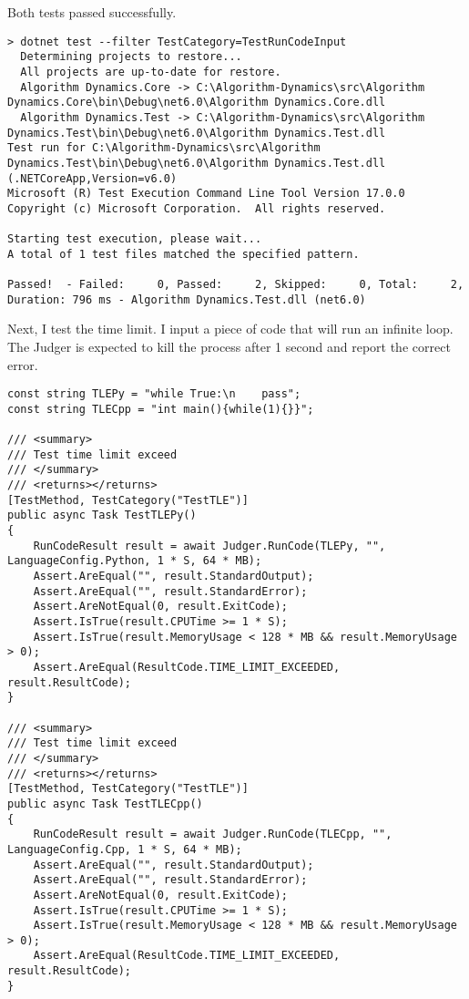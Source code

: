 \documentclass[report.tex]{subfiles}
\begin{document}
Both tests passed successfully.

\begin{verbatim}
> dotnet test --filter TestCategory=TestRunCodeInput
  Determining projects to restore...
  All projects are up-to-date for restore.
  Algorithm Dynamics.Core -> C:\Algorithm-Dynamics\src\Algorithm Dynamics.Core\bin\Debug\net6.0\Algorithm Dynamics.Core.dll
  Algorithm Dynamics.Test -> C:\Algorithm-Dynamics\src\Algorithm Dynamics.Test\bin\Debug\net6.0\Algorithm Dynamics.Test.dll
Test run for C:\Algorithm-Dynamics\src\Algorithm Dynamics.Test\bin\Debug\net6.0\Algorithm Dynamics.Test.dll (.NETCoreApp,Version=v6.0)
Microsoft (R) Test Execution Command Line Tool Version 17.0.0
Copyright (c) Microsoft Corporation.  All rights reserved.

Starting test execution, please wait...
A total of 1 test files matched the specified pattern.

Passed!  - Failed:     0, Passed:     2, Skipped:     0, Total:     2, Duration: 796 ms - Algorithm Dynamics.Test.dll (net6.0)
\end{verbatim}

Next, I test the time limit. I input a piece of code that will run an infinite loop. The Judger is expected to kill the process after 1 second and report the correct error.

\begin{verbatim}
const string TLEPy = "while True:\n    pass";
const string TLECpp = "int main(){while(1){}}";

/// <summary>
/// Test time limit exceed
/// </summary>
/// <returns></returns>
[TestMethod, TestCategory("TestTLE")]
public async Task TestTLEPy()
{
    RunCodeResult result = await Judger.RunCode(TLEPy, "", LanguageConfig.Python, 1 * S, 64 * MB);
    Assert.AreEqual("", result.StandardOutput);
    Assert.AreEqual("", result.StandardError);
    Assert.AreNotEqual(0, result.ExitCode);
    Assert.IsTrue(result.CPUTime >= 1 * S);
    Assert.IsTrue(result.MemoryUsage < 128 * MB && result.MemoryUsage > 0);
    Assert.AreEqual(ResultCode.TIME_LIMIT_EXCEEDED, result.ResultCode);
}

/// <summary>
/// Test time limit exceed
/// </summary>
/// <returns></returns>
[TestMethod, TestCategory("TestTLE")]
public async Task TestTLECpp()
{
    RunCodeResult result = await Judger.RunCode(TLECpp, "", LanguageConfig.Cpp, 1 * S, 64 * MB);
    Assert.AreEqual("", result.StandardOutput);
    Assert.AreEqual("", result.StandardError);
    Assert.AreNotEqual(0, result.ExitCode);
    Assert.IsTrue(result.CPUTime >= 1 * S);
    Assert.IsTrue(result.MemoryUsage < 128 * MB && result.MemoryUsage > 0);
    Assert.AreEqual(ResultCode.TIME_LIMIT_EXCEEDED, result.ResultCode);
}
\end{verbatim}
\end{document}
